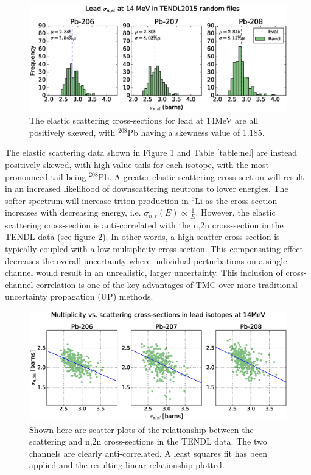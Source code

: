 \begin{figure}[ht]
  \includegraphics[width=\textwidth]{pb_tendl_nel_hist}
  \caption{The elastic scattering cross-sections for lead at 14MeV are all positively skewed, with $^{208}$Pb having a skewness value of 1.185.}
  \label{fig:tendl_nel}
\end{figure}

The elastic scattering data shown in Figure \ref{fig:tendl_nel} and Table \ref{table:nel} are instead positively skewed, with high value tails for each isotope, with the most pronounced tail being $^{208}$Pb. A greater elastic scattering cross-section will result in an increased likelihood of downscattering neutrons to lower energies. The softer spectrum will increase triton production in $^{6}$Li as the cross-section increases with decreasing energy, i.e. $\sigma_{n,t}(E) \propto \frac{1}{E}$. However, the elastic scattering cross-section is anti-correlated with the n,2n cross-section in the TENDL data (see figure \ref{fig:pb_el_n2n_corr}). In other words, a high scatter cross-section is typically coupled with a low multiplicity cross-section. This compensating effect decreases the overall uncertainty where individual perturbations on a single channel would result in an unrealistic, larger uncertainty. This inclusion of cross-channel correlation is one of the key advantages of TMC over more traditional uncertainty propagation (UP) methods. 

\begin{figure}[ht]
	\includegraphics[width=\textwidth]{pb_el_n2n_corr}
  \caption{Shown here are scatter plots of the relationship between the scattering and n,2n cross-sections in the TENDL data. The two channels are clearly anti-correlated. A least squares fit has been applied and the resulting linear relationship plotted.}
	\label{fig:pb_el_n2n_corr}
\end{figure}

